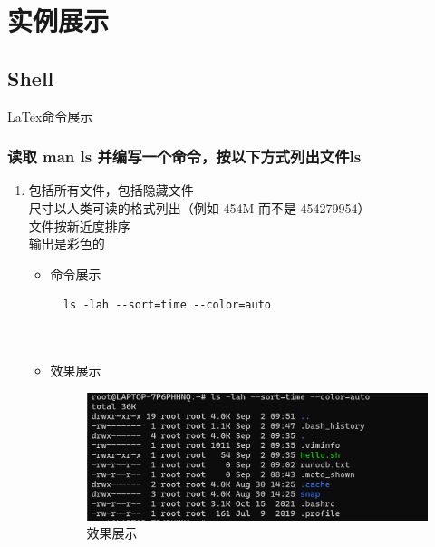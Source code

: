 \documentclass[UTF8]{ctexart}
\begin{document}
\section{实例展示}

  \subsection{Shell}
  {\color{blue}LaTex命令展示}



\subsubsection{读取 man ls 并编写一个命令，按以下方式列出文件ls}

\begin{enumerate}
  \item 包括所有文件，包括隐藏文件\\
尺寸以人类可读的格式列出（例如 454M 而不是 454279954）\\
文件按新近度排序\\
输出是彩色的
  \begin{itemize}
  \item 命令展示
  \begin{verbatim}
  ls -lah --sort=time --color=auto

    
  \end{verbatim}

  \item 效果展示
  \begin{figure}[H]
    \centering
    \includegraphics[width=\textwidth]{1} %
    \caption{效果展示}
  
  \end{figure}
\end{itemize}
\end{enumerate}
\end{document}
